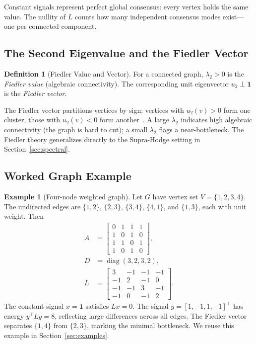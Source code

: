 \documentclass[11pt]{article}
\theoremstyle{definition}
\newtheorem{definition}[theorem]{Definition}
\newtheorem{example}[theorem]{Example}
\theoremstyle{remark}
\DeclareMathOperator{\diag}{diag}
\begin{document}
Constant signals represent perfect global consensus: every vertex holds the
same value. The nullity of $L$ counts how many independent consensus modes
exist---one per connected component.

\subsection{The Second Eigenvalue and the Fiedler Vector}

\begin{definition}[Fiedler Value and Vector]
For a connected graph, $\lambda_2 > 0$ is the \emph{Fiedler value} (algebraic
connectivity). The corresponding unit eigenvector $u_2 \perp \mathbf{1}$ is the
\emph{Fiedler vector}.
\end{definition}

The Fiedler vector partitions vertices by sign: vertices with $u_2(v)>0$ form
one cluster, those with $u_2(v)<0$ form another~\cite{chung1997}. A large
$\lambda_2$ indicates high algebraic connectivity (the graph is hard to cut);
a small $\lambda_2$ flags a near-bottleneck. The Fiedler theory generalizes
directly to the Supra-Hodge setting in Section~\ref{sec:spectral}.

\subsection{Worked Graph Example}

\begin{example}[Four-node weighted graph]
\label{ex:4node}
Let $G$ have vertex set $V=\{1,2,3,4\}$. The undirected edges are
$\{1,2\}$, $\{2,3\}$, $\{3,4\}$, $\{4,1\}$, and $\{1,3\}$, each with unit weight. Then
\begingroup
\setlength{\arraycolsep}{3pt}
\small
\[
  \begin{aligned}
    A &= \begin{bmatrix}
      0 & 1 & 1 & 1\\
      1 & 0 & 1 & 0\\
      1 & 1 & 0 & 1\\
      1 & 0 & 1 & 0
    \end{bmatrix},\\[4pt]
    D &= \diag(3,2,3,2),\\[4pt]
    L &= \begin{bmatrix}
      3 & -1 & -1 & -1\\
      -1 & 2 & -1 & 0\\
      -1 & -1 & 3 & -1\\
      -1 & 0 & -1 & 2
    \end{bmatrix}.
  \end{aligned}
\]
\endgroup
The constant signal $x=\mathbf{1}$ satisfies $Lx=0$. The signal
$y=[1,-1,1,-1]^\top$ has energy $y^\top Ly = 8$, reflecting large differences
across all edges. The Fiedler vector separates $\{1,4\}$ from $\{2,3\}$,
marking the minimal bottleneck. We reuse this example in
Section~\ref{sec:examples}.
\end{example}
\end{document}
